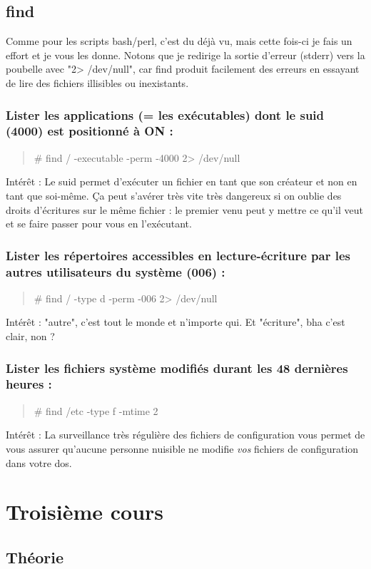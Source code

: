 \documentclass[a4paper,11pt]{article}
\newcommand{\commande}[1] {
    \begin{quote}
    \tt\raggedright #1
    \end{quote}
}
\begin{document}
\subsection{find}
\par Comme pour les scripts bash/perl, c'est du déjà vu, mais cette fois-ci je fais un effort et je vous les donne. Notons que je redirige la sortie d'erreur (stderr) vers la poubelle avec "2> /dev/null", car find produit facilement des erreurs en essayant de lire des fichiers illisibles ou inexistants.
\subsubsection*{Lister les applications (= les exécutables) dont le suid (4000) est positionné à ON :}
\commande{\# find / -executable -perm -4000 2> /dev/null}
\par Intérêt : Le suid permet d'exécuter un fichier en tant que son créateur et non en tant que soi-même. Ça peut s'avérer très vite très dangereux si on oublie des droits d'écritures sur le même fichier : le premier venu peut y mettre ce qu'il veut et se faire passer pour vous en l'exécutant.
\subsubsection*{Lister les répertoires accessibles en lecture-écriture par les autres utilisateurs du système (006) :}
\commande{\# find / -type d -perm -006 2> /dev/null}
\par Intérêt : "autre", c'est tout le monde et n'importe qui. Et "écriture", bha c'est clair, non ?
\subsubsection*{Lister les fichiers système modifiés durant les 48 dernières heures :}
\commande{\# find /etc -type f -mtime 2}
\par Intérêt : La surveillance très régulière des fichiers de configuration vous permet de vous assurer qu'aucune personne nuisible ne modifie \emph{vos} fichiers de configuration dans votre dos.

\section{Troisième cours}
\subsection{Théorie}
\end{document}
